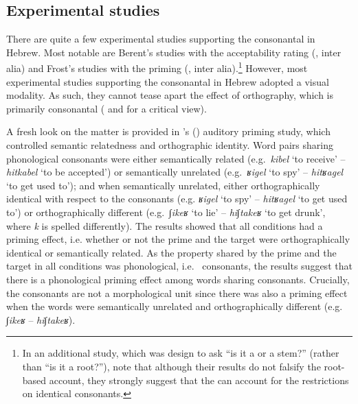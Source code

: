 \documentclass[output=paper,
modfonts
]{LSP/langsci}
\begin{document}
\subsection{Experimental studies}\label{sec:batel:5.2}
There are quite a few experimental studies supporting the consonantal  in Hebrew. Most
notable are Berent's studies with the acceptability rating 
(\citealt{berent1997a, berent2001a}, inter alia) and Frost's
studies with the priming  (\citealt{Frost1997, frost2000a}, inter
alia).\footnote{In an additional study, which was design to ask ``is it
  a  or a stem?'' (rather than ``is it a root?''), \citet{berent2007aB} note that although their results do not falsify the root-based
  account, they strongly suggest that the  can account for the
  restrictions on identical consonants.} However, most experimental
studies supporting the consonantal  in Hebrew  adopted a
visual modality. As such, they cannot tease apart the effect of
orthography, which is primarily consonantal (\citealt{batel2002a} and \citealt{berrebi2016a} for a critical view).

A fresh look on the matter is provided in \citeauthor{berrebi2016a}'s (\citeyear{berrebi2016a}) auditory
priming study, which controlled semantic relatedness and orthographic
identity. Word pairs sharing phonological  consonants were either
semantically related (e.g.\ \emph{kibel} `to receive' -- \emph{hitkabel}
`to be accepted') or semantically unrelated (e.g.\ \emph{ʁigel} `to spy'
-- \emph{hitʁagel} `to get used to'); and when semantically unrelated,
either orthographically identical with respect to the consonants (e.g.
\emph{ʁigel} `to spy' -- \emph{hitʁagel} `to get used to') or
orthographically different (e.g.\ \emph{∫ikeʁ} `to lie' --
\emph{hi∫takeʁ} `to get drunk', where \emph{k} is spelled differently).
The results showed that all conditions had a priming effect, i.e.
whether or not the prime and the target were orthographically identical
or semantically related. As the property shared by the prime and the
target in all conditions was phonological, i.e.\  consonants, the
results suggest that there is a phonological priming effect among words
sharing  consonants. Crucially, the  consonants are not a
morphological unit since there was also a priming effect when the words
were semantically unrelated and orthographically different (e.g.
\emph{∫ikeʁ} -- \emph{hi∫takeʁ}).
\end{document}
